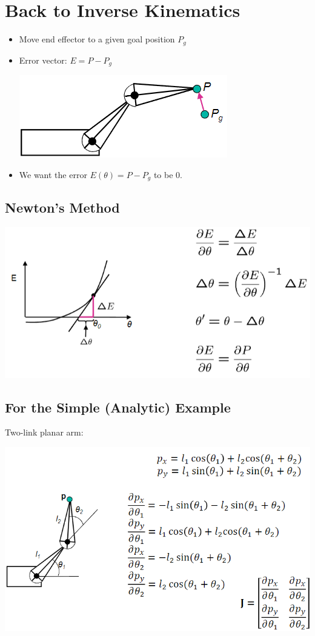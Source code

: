 \documentclass{article}
\begin{document}
\section*{Back to Inverse Kinematics}
\begin{itemize}
    \item Move end effector to a given goal position $P_g$
    \item Error vector: $E = P - P_g$
    \begin{center}
        \includegraphics*[scale=0.8]{W7_15.png}
    \end{center}
    \item We want the error $E(\theta) = P - P_g$ to be 0.
\end{itemize}

\subsection*{Newton's Method}
\begin{center}
    \includegraphics*[scale=0.8]{W7_16.png}
\end{center}

\subsection*{For the Simple (Analytic) Example}
Two-link planar arm:
\begin{center} 
    \includegraphics*[scale=0.8]{W7_17.png}
\end{center}
\end{document}
